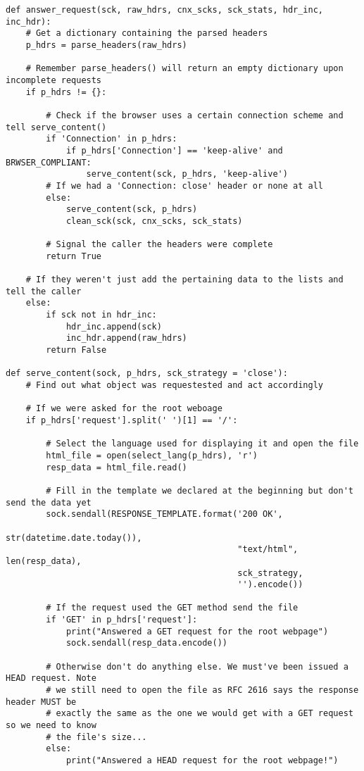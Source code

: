 \documentclass[landscape]{article}
\begin{document}
\begin{verbatim}
def answer_request(sck, raw_hdrs, cnx_scks, sck_stats, hdr_inc, inc_hdr):
    # Get a dictionary containing the parsed headers
    p_hdrs = parse_headers(raw_hdrs)

    # Remember parse_headers() will return an empty dictionary upon incomplete requests
    if p_hdrs != {}:

        # Check if the browser uses a certain connection scheme and tell serve_content()
        if 'Connection' in p_hdrs:
            if p_hdrs['Connection'] == 'keep-alive' and BRWSER_COMPLIANT:
                serve_content(sck, p_hdrs, 'keep-alive')
        # If we had a 'Connection: close' header or none at all
        else:
            serve_content(sck, p_hdrs)
            clean_sck(sck, cnx_scks, sck_stats)

        # Signal the caller the headers were complete
        return True

    # If they weren't just add the pertaining data to the lists and tell the caller
    else:
        if sck not in hdr_inc:
            hdr_inc.append(sck)
            inc_hdr.append(raw_hdrs)
        return False

def serve_content(sock, p_hdrs, sck_strategy = 'close'):
    # Find out what object was requestested and act accordingly

    # If we were asked for the root weboage
    if p_hdrs['request'].split(' ')[1] == '/':

        # Select the language used for displaying it and open the file
        html_file = open(select_lang(p_hdrs), 'r')
        resp_data = html_file.read()

        # Fill in the template we declared at the beginning but don't send the data yet
        sock.sendall(RESPONSE_TEMPLATE.format('200 OK',
                                              str(datetime.date.today()),
                                              "text/html", len(resp_data),
                                              sck_strategy,
                                              '').encode())

        # If the request used the GET method send the file
        if 'GET' in p_hdrs['request']:
            print("Answered a GET request for the root webpage")
            sock.sendall(resp_data.encode())

        # Otherwise don't do anything else. We must've been issued a HEAD request. Note
        # we still need to open the file as RFC 2616 says the response header MUST be
        # exactly the same as the one we would get with a GET request so we need to know
        # the file's size...
        else:
            print("Answered a HEAD request for the root webpage!")


\end{verbatim}
\end{document}
